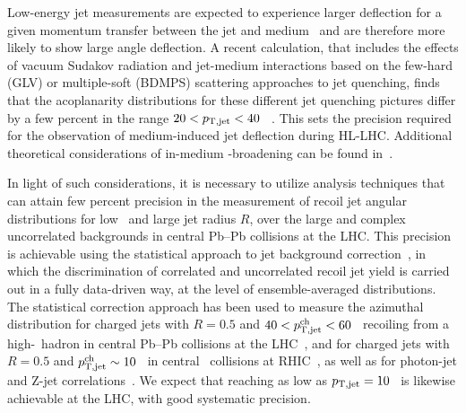 Low-energy jet measurements are expected to experience larger deflection for a given momentum transfer between the jet and medium~\cite{DEramo:2018eoy,Gyulassy:2018qhr} and are therefore more likely to show large angle deflection. 
A recent calculation, that includes the effects of vacuum Sudakov radiation and jet-medium interactions based on the few-hard (GLV) or multiple-soft (BDMPS) scattering approaches to jet quenching, finds that the acoplanarity distributions for these different jet quenching pictures differ by a few percent in the range $20<p_{\mathrm{T,jet}}<40$ \gevc~\cite{Gyulassy:2018qhr}. This sets the precision required for the observation of medium-induced jet deflection during HL-LHC. Additional theoretical considerations of in-medium \pT-broadening can be found in~\cite{Zakharov:2018rst,Ghiglieri:2018ltw}.

In light of such considerations, it is necessary to utilize analysis techniques that can attain few percent precision in the measurement of recoil jet angular distributions for low \ptjet\ and large jet radius $R$, over the large and complex uncorrelated backgrounds in central Pb--Pb collisions at the LHC. This precision is achievable using the statistical approach to jet background correction~\cite{Adam:2015doa,Adamczyk:2017yhe,Sirunyan:2017jic,Sirunyan:2017qhf}, in which the discrimination of correlated and uncorrelated recoil jet yield is carried out in a fully data-driven way, at the level of ensemble-averaged distributions. The statistical correction approach has been used to measure the azimuthal distribution for charged jets with $R=0.5$ and $40<p_{\mathrm{T,jet}}^{\mathrm{ch}}<60$ \gevc\ recoiling from a high-\pt\ hadron in central Pb--Pb collisions at the LHC~\cite{Adam:2015doa}, and for charged jets with $R=0.5$ and $p_{\mathrm{T,jet}}^{\mathrm{ch}}\sim10$ \gevc\ in central \AuAu\ collisions at RHIC~\cite{Adamczyk:2017yhe}, as well as for photon-jet and Z-jet correlations~\cite{Sirunyan:2017jic,Sirunyan:2017qhf}. We expect that reaching as low as $p_{\mathrm{T,jet}}=10$ \gevc\ is likewise achievable at the LHC, with good systematic precision. 

